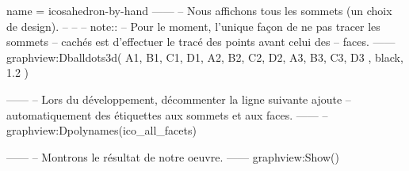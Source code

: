 \documentclass[border = 3pt]{standalone}
\begin{document}
\begin{luadraw*}{name = icosahedron-by-hand}
------
-- Nous affichons tous les sommets (un choix de design).
--
--
-- note::
--     Pour le moment, l'unique façon de ne pas tracer les sommets
--     cachés est d'effectuer le tracé des points avant celui des
--     faces.
------
graphview:Dballdots3d(
  {
    A1, B1, C1, D1,
    A2, B2, C2, D2,
    A3, B3, C3, D3
  },
  black,
  1.2
)

------
-- Lors du développement, décommenter la ligne suivante ajoute
-- automatiquement des étiquettes aux sommets et aux faces.
------
-- graphview:Dpolynames(ico_all_facets)

------
-- Montrons le résultat de notre oeuvre.
------
graphview:Show()
\end{luadraw*}
\end{document}
